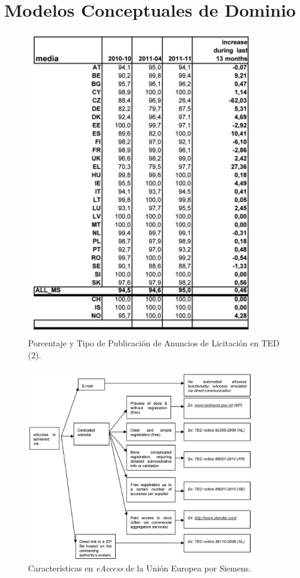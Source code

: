 \section{Modelos Conceptuales de Dominio}\label{sect:mcds}
% 


\begin{figure}[!htb]
\centering
	\includegraphics[width=10cm]{images/phd/eproc/circa-2}
\caption{Porcentaje y Tipo de Publicación de Anuncios de Licitación en TED (2).}
\label{fig:circa-1}
\end{figure}



\begin{figure}[!htb]
\centering
	\includegraphics[width=10cm]{images/phd/eproc/ted-4}
\caption{Características en \textit{eAccess} de la Unión Europea por Siemens.}
\label{fig:ted-4}
\end{figure}



